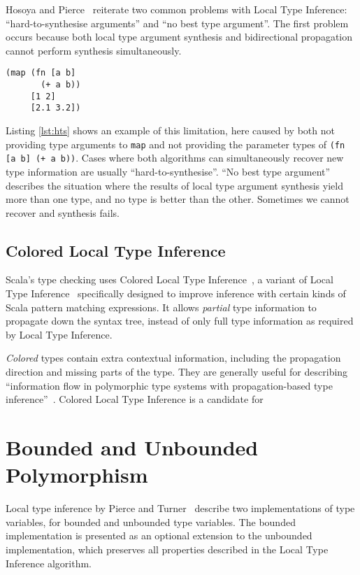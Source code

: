 Hosoya and Pierce~\cite{HP99} reiterate two common problems with Local Type Inference:
``hard-to-synthesise arguments'' and ``no best type argument''. The first problem occurs because
both local type argument synthesis and bidirectional propagation cannot perform synthesis
simultaneously. 

\begin{lstlisting}[caption=Hard-to-synthesise expression, label=lst:hts]
(map (fn [a b] 
       (+ a b)) 
     [1 2] 
     [2.1 3.2])
\end{lstlisting}

Listing \ref{lst:hts} shows an example of this limitation,
here caused by both not providing type arguments to \lstinline|map| and not providing the parameter types of \lstinline|(fn [a b] (+ a b))|.
 Cases where both algorithms can simultaneously recover new type information are usually ``hard-to-synthesise''.
``No best type argument'' describes the situation where the results of local
type argument synthesis yield more than one type, and no type is better than the other. Sometimes we cannot recover and synthesis
fails.

\subsection{Colored Local Type Inference}

Scala's type checking uses Colored Local Type Inference~\cite{OZZ01},
a variant of Local Type Inference~\cite{PT00} specifically designed to
improve inference with certain kinds of Scala pattern matching expressions. It allows
\emph{partial} type information to propagate down the syntax tree, instead of only full type information
as required by Local Type Inference.

\emph{Colored} types contain extra contextual information, including the propagation direction
and missing parts of the type. They are generally useful
for describing ``information flow in polymorphic type systems with propagation-based type inference''~\cite{OZZ01}. 
Colored Local Type Inference is a candidate for 

\section{Bounded and Unbounded Polymorphism}

Local type inference by Pierce and Turner~\cite{PT00}
describe two implementations of type variables, for bounded
and unbounded type variables. The bounded implementation is presented
as an optional extension  to the unbounded implementation, which preserves all
properties described in the Local Type Inference algorithm.

